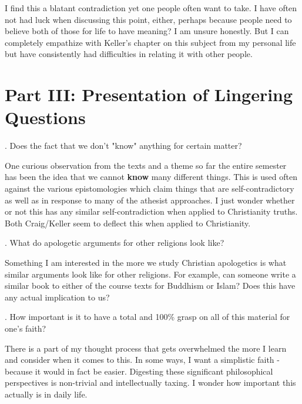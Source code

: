 \documentclass[12pt]{turabian-researchpaper}
\begin{document}
I find this a blatant contradiction yet one people often want to take. I have often not had luck when discussing this point, either, perhaps because people need to believe both of those for life to have meaning? I am unsure honestly. But I can completely empathize with Keller's chapter on this subject from my personal life but have consistently had difficulties in relating it with other people.

\section{Part III: Presentation of Lingering Questions}

. Does the fact that we don't "know" anything for certain matter?

One curious observation from the texts and a theme so far the entire semester has been the idea that we cannot \textbf{know} many different things. This is used often against the various epistomologies which claim things that are self-contradictory as well as in response to many of the athesist approaches. I just wonder whether or not this has any similar self-contradiction when applied to Christianity truths. Both Craig/Keller seem to deflect this when applied to Christianity.

. What do apologetic arguments for other religions look like?

Something I am interested in the more we study Christian apologetics is what similar arguments look like for other religions. For example, can someone write a similar book to either of the course texts for Buddhism or Islam? Does this have any actual implication to us?

. How important is it to have a total and 100\% grasp on all of this material for one's faith?

There is a part of my thought process that gets overwhelmed the more I learn and consider when it comes to this. In some ways, I want a simplistic faith - because it would in fact be easier. Digesting these significant philosophical perspectives is non-trivial and intellectually taxing. I wonder how important this actually is in daily life.
\end{document}
